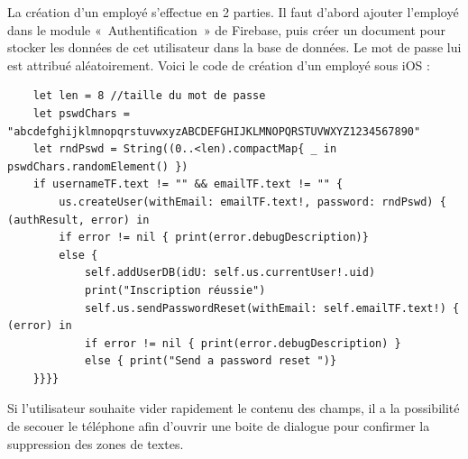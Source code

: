 \documentclass{article}
\begin{document}
La création d’un employé s’effectue en 2 parties. Il faut d'abord ajouter l’employé dans le module « Authentification » de Firebase, puis créer un document pour stocker les données de cet utilisateur dans la base de données. Le mot de passe lui est attribué aléatoirement.
Voici le code de création d'un employé sous iOS :
\begin{verbatim}
    let len = 8 //taille du mot de passe
    let pswdChars = "abcdefghijklmnopqrstuvwxyzABCDEFGHIJKLMNOPQRSTUVWXYZ1234567890"
    let rndPswd = String((0..<len).compactMap{ _ in pswdChars.randomElement() })
    if usernameTF.text != "" && emailTF.text != "" {
		us.createUser(withEmail: emailTF.text!, password: rndPswd) { (authResult, error) in
        if error != nil { print(error.debugDescription)}
        else {
            self.addUserDB(idU: self.us.currentUser!.uid)
            print("Inscription réussie")
            self.us.sendPasswordReset(withEmail: self.emailTF.text!) { (error) in
            if error != nil { print(error.debugDescription) }
            else { print("Send a password reset ")}
	}}}} 
\end{verbatim}

Si l'utilisateur souhaite vider rapidement le contenu des champs, il a la possibilité de secouer le téléphone afin d'ouvrir une boite de dialogue pour confirmer la suppression des zones de textes.
\end{document}
